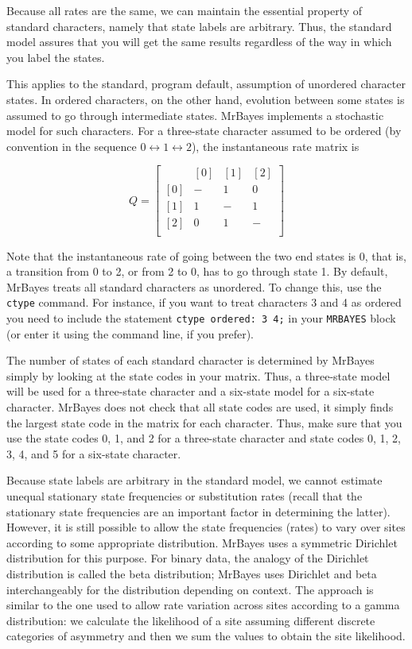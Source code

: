 \documentclass[12pt]{book}
\newcommand{\ttt}[1]{\texttt{#1}}
\begin{document}
Because all rates are the same, we can maintain the essential property of standard characters,
namely that state labels are arbitrary. Thus, the standard model assures that you will get the same
results regardless of the way in which you label the states.

This applies to the standard, program default, assumption of unordered character states. In ordered
characters, on the other hand, evolution between some states is assumed to go through intermediate
states. MrBayes implements a stochastic model for such characters. For a three-state character
assumed to be ordered (by convention in the sequence $0 \leftrightarrow 1 \leftrightarrow 2$), the
instantaneous rate matrix is

\[
Q=\begin{bmatrix}
    & [0] & [1] & [2]\\
 [0]& - & 1 & 0\\
 [1]& 1& -  & 1\\
 [2]& 0& 1  & -\\
\end{bmatrix}
\]

Note that the instantaneous rate of going between the two end states is 0, that is, a transition
from 0 to 2, or from 2 to 0, has to go through state 1. By default, MrBayes treats all standard
characters as unordered. To change this, use the \ttt{ctype} command. For instance, if you want to
treat characters 3 and 4 as ordered you need to include the statement \ttt{ctype ordered: 3 4;} in
your \ttt{MRBAYES} block (or enter it using the command line, if you prefer).

The number of states of each standard character is determined by MrBayes simply by looking at the
state codes in your matrix. Thus, a three-state model will be used for a three-state character and
a six-state model for a six-state character. MrBayes does not check that all state codes are used,
it simply finds the largest state code in the matrix for each character. Thus, make sure that you
use the state codes 0, 1, and 2 for a three-state character and state codes 0, 1, 2, 3, 4, and 5
for a six-state character.

Because state labels are arbitrary in the standard model, we cannot estimate unequal stationary
state frequencies or substitution rates (recall that the stationary state frequencies are an
important factor in determining the latter). However, it is still possible to allow the state
frequencies (rates) to vary over sites according to some appropriate distribution. MrBayes uses a
symmetric Dirichlet distribution for this purpose. For binary data, the analogy of the Dirichlet
distribution is called the beta distribution; MrBayes uses Dirichlet and beta interchangeably for
the distribution depending on context. The approach is similar to the one used to allow rate
variation across sites according to a gamma distribution: we calculate the likelihood of a site
assuming different discrete categories of asymmetry and then we sum the values to obtain the site
likelihood.
\end{document}
